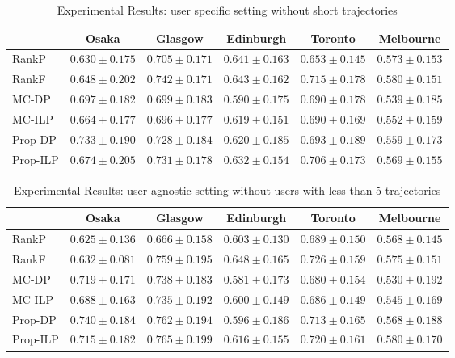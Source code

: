 \begin{table*}
\centering
\caption{Experimental Results: user specific setting without short trajectories}
\begin{tabular}{l|ccccc} \hline
 & Osaka & Glasgow & Edinburgh & Toronto & Melbourne \\ \hline
RankP & $0.630\pm0.175$ & $0.705\pm0.171$ & $0.641\pm0.163$ & $0.653\pm0.145$ & $0.573\pm0.153$ \\
RankF & $0.648\pm0.202$ & $\mathbf{0.742\pm0.171}$ & $\mathbf{0.643\pm0.162}$ & $\mathbf{0.715\pm0.178}$ & $\mathbf{0.580\pm0.151}$ \\
MC-DP & $0.697\pm0.182$ & $0.699\pm0.183$ & $0.590\pm0.175$ & $0.690\pm0.178$ & $0.539\pm0.185$ \\
MC-ILP & $0.664\pm0.177$ & $0.696\pm0.177$ & $0.619\pm0.151$ & $0.690\pm0.169$ & $0.552\pm0.159$ \\
Prop-DP & $\mathbf{0.733\pm0.190}$ & $0.728\pm0.184$ & $0.620\pm0.185$ & $0.693\pm0.189$ & $0.559\pm0.173$ \\
Prop-ILP & $0.674\pm0.205$ & $0.731\pm0.178$ & $0.632\pm0.154$ & $0.706\pm0.173$ & $0.569\pm0.155$ \\
\hline
\end{tabular}
\end{table*}

\begin{table*}
\centering
\caption{Experimental Results: user agnostic setting without users with less than 5 trajectories}
\begin{tabular}{l|ccccc} \hline
 & Osaka & Glasgow & Edinburgh & Toronto & Melbourne \\ \hline
RankP & $0.625\pm0.136$ & $0.666\pm0.158$ & $0.603\pm0.130$ & $0.689\pm0.150$ & $0.568\pm0.145$ \\
RankF & $0.632\pm0.081$ & $0.759\pm0.195$ & $\mathbf{0.648\pm0.165}$ & $\mathbf{0.726\pm0.159}$ & $0.575\pm0.151$ \\
MC-DP & $0.719\pm0.171$ & $0.738\pm0.183$ & $0.581\pm0.173$ & $0.680\pm0.154$ & $0.530\pm0.192$ \\
MC-ILP & $0.688\pm0.163$ & $0.735\pm0.192$ & $0.600\pm0.149$ & $0.686\pm0.149$ & $0.545\pm0.169$ \\
Prop-DP & $\mathbf{0.740\pm0.184}$ & $0.762\pm0.194$ & $0.596\pm0.186$ & $0.713\pm0.165$ & $0.568\pm0.188$ \\
Prop-ILP & $0.715\pm0.182$ & $\mathbf{0.765\pm0.199}$ & $0.616\pm0.155$ & $0.720\pm0.161$ & $\mathbf{0.580\pm0.170}$ \\
\hline
\end{tabular}
\end{table*}

